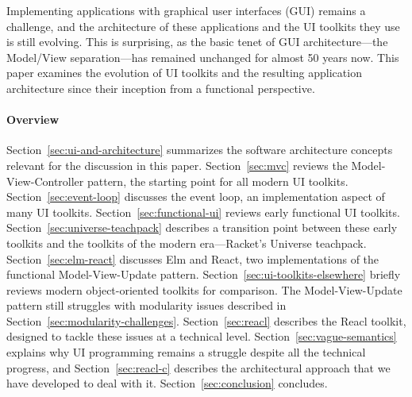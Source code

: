 \documentclass[sigplan,screen]{acmart}
\begin{document}


\maketitle

Implementing applications with graphical user interfaces (GUI) remains
a challenge, and the architecture of these applications and the UI
toolkits they use is still evolving.  This is surprising, as the basic
tenet of GUI architecture---the Model/View separation---has remained
unchanged for almost 50 years now.
This paper examines the evolution of UI toolkits and the resulting
application architecture since their inception from a functional
perspective.

\paragraph{Overview} Section~\ref{sec:ui-and-architecture} summarizes
the software architecture concepts relevant for the discussion in
this paper.  Section~\ref{sec:mvc} reviews the Model-View-Controller
pattern, the starting point for all modern UI toolkits.
Section~\ref{sec:event-loop} discusses the event loop, an
implementation aspect of many UI toolkits.  Section~\ref{sec:functional-ui} reviews
early functional UI toolkits.  Section~\ref{sec:universe-teachpack}
describes a transition point between these early toolkits and the
toolkits of the modern era---Racket's Universe teachpack.
Section~\ref{sec:elm-react} discusses Elm and React, two
implementations of the functional Model-View-Update pattern.
Section~\ref{sec:ui-toolkits-elsewhere} briefly reviews modern
object-oriented toolkits for comparison.  The Model-View-Update
pattern still struggles with modularity issues described in
Section~\ref{sec:modularity-challenges}.  Section~\ref{sec:reacl}
describes the Reacl toolkit, designed to tackle these issues at a
technical level.  Section~\ref{sec:vague-semantics} explains why UI
programming remains a struggle despite all the technical progress, and
Section~\ref{sec:reacl-c} describes the architectural approach that we
have developed to deal with it.  Section~\ref{sec:conclusion} concludes.
\end{document}
